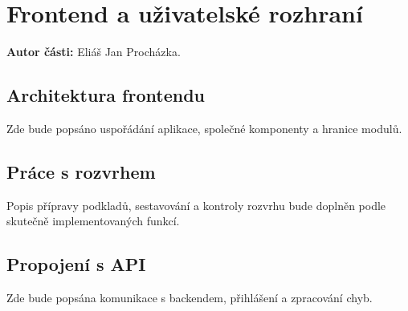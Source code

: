 \chapter{Frontend a uživatelské rozhraní}
\label{chap:frontend}
\textbf{Autor části:} Eliáš Jan Procházka.

\section{Architektura frontendu}
Zde bude popsáno uspořádání aplikace, společné komponenty a hranice modulů.

\section{Práce s rozvrhem}
Popis přípravy podkladů, sestavování a kontroly rozvrhu bude doplněn
podle skutečně implementovaných funkcí.

\section{Propojení s API}
Zde bude popsána komunikace s backendem, přihlášení a zpracování chyb.
